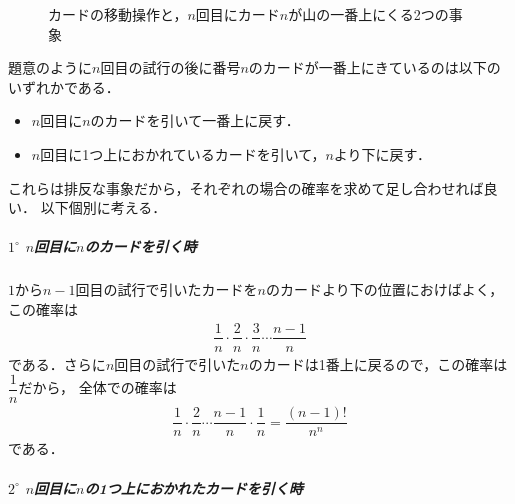 \documentclass[../../main.tex]{subfiles}
\begin{document}
\begin{figure}[htb]
\caption{カードの移動操作と，$n$回目にカード$n$が山の一番上にくる2つの事象}
\label{fig:card_pile}
\end{figure}

題意のように$n$回目の試行の後に番号$n$のカードが一番上にきているのは以下のいずれかである．
\begin{itemize}
\item $n$回目に$n$のカードを引いて一番上に戻す．\\
\item $n$回目に1つ上におかれているカードを引いて，$n$より下に戻す．
\end{itemize}
これらは排反な事象だから，それぞれの場合の確率を求めて足し合わせれば良い．
以下個別に考える．

\subparagraph{$1^{\circ}$ $n$回目に$n$のカードを引く時}

$1$から$n-1$回目の試行で引いたカードを$n$のカードより下の位置におけばよく，この確率は
\begin{align}
\dfrac{1}{n}\cdot\dfrac{2}{n}\cdot\dfrac{3}{n}\cdots\dfrac{n-1}{n}
\end{align}
である．さらに$n$回目の試行で引いた$n$のカードは1番上に戻るので，この確率は$\dfrac{1}{n}$だから，
全体での確率は
\begin{align}
\dfrac{1}{n}\cdot\dfrac{2}{n}\cdots\dfrac{n-1}{n}\cdot\dfrac{1}{n}
=\dfrac{(n-1)!}{n^n} \label{eq:1}
\end{align}
である．

\subparagraph{$2^{\circ}$ $n$回目に$n$の1つ上におかれたカードを引く時}
\end{document}
